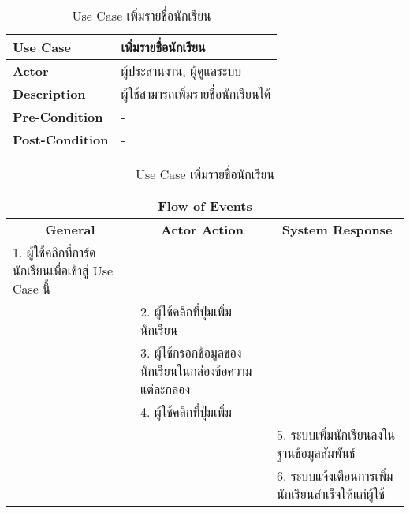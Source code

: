 \begin{table}[H]
    \caption{Use Case เพิ่มรายชื่อนักเรียน}
    \label{tab:use-case-create-student}
    \begin{tabularx}{\textwidth}{ | p{3cm} | X | }
    \hline
    \textbf{Use Case} & เพิ่มรายชื่อนักเรียน \\
    \hline
    \textbf{Actor} & ผู้ประสานงาน, ผู้ดูแลระบบ \\
    \hline
    \textbf{Description} & ผู้ใช้สามารถเพิ่มรายชื่อนักเรียนได้ \\
    \hline
    \textbf{Pre-Condition} & - \\
    \hline
    \textbf{Post-Condition} & - \\
    \hline
    \end{tabularx}
    \begin{tabularx}{\textwidth}{ | X | X | X | }
    \multicolumn{3}{|c|}{\textbf{Flow of Events}} \\
    \hline
    \multicolumn{1}{|c|}{\textbf{General}} & \multicolumn{1}{|c|}{\textbf{Actor Action}} & \multicolumn{1}{|c|}{\textbf{System Response}} \\
    \hline
    1. ผู้ใช้คลิกที่การ์ดนักเรียนเพื่อเข้าสู่ Use Case นี้ & & \\
    \hline
    & 2. ผู้ใช้คลิกที่ปุ่มเพิ่มนักเรียน & \\
    \hline
    & 3. ผู้ใช้กรอกข้อมูลของนักเรียนในกล่องข้อความแต่ละกล่อง & \\
    \hline
    & 4. ผู้ใช้คลิกที่ปุ่มเพิ่ม & \\
    \hline
    & & 5. ระบบเพิ่มนักเรียนลงในฐานข้อมูลสัมพันธ์ \\
    \hline
    & & 6. ระบบแจ้งเตือนการเพิ่มนักเรียนสำเร็จให้แก่ผู้ใช้ \\
    \hline
    \end{tabularx}
\end{table}
